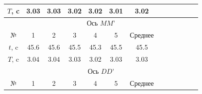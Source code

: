 \documentclass[a4paper, 12pt]{article}
\begin{document}
\begin{enumerate}
\begin{table}[H]
\begin{tabular}{|ccccccccccccc|}
			\multicolumn{1}{|c|}{$T$, c}  & \multicolumn{1}{c|}{3.03} & \multicolumn{1}{c|}{3.03} & \multicolumn{1}{c|}{3.02} & \multicolumn{1}{c|}{3.02} & \multicolumn{1}{c|}{3.01} & \multicolumn{1}{c|}{3.02}    & \multicolumn{1}{c|}{}     & \multicolumn{1}{c|}{}     & \multicolumn{1}{c|}{}     & \multicolumn{1}{c|}{}     & \multicolumn{1}{c|}{}               &              \\ \hline
			\multicolumn{13}{|c|}{Ось $MM’$}                                                                                                                                                                                                                                                                                                                                              \\ \hline
			\multicolumn{1}{|c|}{№}       & \multicolumn{1}{c|}{1}    & \multicolumn{1}{c|}{2}    & \multicolumn{1}{c|}{3}    & \multicolumn{1}{c|}{4}    & \multicolumn{1}{c|}{5}    & \multicolumn{1}{c|}{Среднее} & \multicolumn{1}{c|}{}     & \multicolumn{1}{c|}{}     & \multicolumn{1}{c|}{}     & \multicolumn{1}{c|}{}     & \multicolumn{1}{c|}{}               &              \\ \hline
			\multicolumn{1}{|c|}{$t$, c}  & \multicolumn{1}{c|}{45.6} & \multicolumn{1}{c|}{45.6} & \multicolumn{1}{c|}{45.5} & \multicolumn{1}{c|}{45.3} & \multicolumn{1}{c|}{45.5} & \multicolumn{1}{c|}{45.5}    & \multicolumn{1}{c|}{}     & \multicolumn{1}{c|}{}     & \multicolumn{1}{c|}{}     & \multicolumn{1}{c|}{}     & \multicolumn{1}{c|}{}               &              \\ \hline
			\multicolumn{1}{|c|}{$T$, c}  & \multicolumn{1}{c|}{3.04} & \multicolumn{1}{c|}{3.04} & \multicolumn{1}{c|}{3.03} & \multicolumn{1}{c|}{3.02} & \multicolumn{1}{c|}{3.03} & \multicolumn{1}{c|}{3.03}    & \multicolumn{1}{c|}{}     & \multicolumn{1}{c|}{}     & \multicolumn{1}{c|}{}     & \multicolumn{1}{c|}{}     & \multicolumn{1}{c|}{}               &              \\ \hline
			\multicolumn{13}{|c|}{Ось $DD’$}                                                                                                                                                                                                                                                                                                                                              \\ \hline
			\multicolumn{1}{|c|}{№}       & \multicolumn{1}{c|}{1}    & \multicolumn{1}{c|}{2}    & \multicolumn{1}{c|}{3}    & \multicolumn{1}{c|}{4}    & \multicolumn{1}{c|}{5}    & \multicolumn{1}{c|}{Среднее} & \multicolumn{1}{c|}{}     & \multicolumn{1}{c|}{}     & \multicolumn{1}{c|}{}     & \multicolumn{1}{c|}{}     & \multicolumn{1}{c|}{}               &              \\ \hline

\end{tabular}
\end{table}
\end{enumerate}
\end{document}
